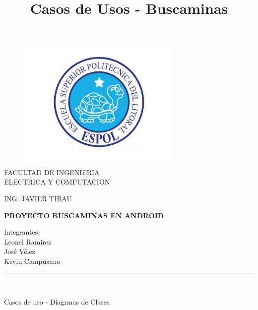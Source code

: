 \documentclass[11pt]{article} %
\title{Casos de Usos - Buscaminas }
\begin{document}
\begin{titlepage}

\begin{center}
\vspace*{-1in}
\begin{figure}[htb]
\begin{center}
\includegraphics[width=8cm]{./espol}
\end{center}
\end{figure}

FACULTAD DE INGENIERIA \\
\vspace*{0.15in}
ELECTRICA Y COMPUTACION \\
\vspace*{0.6in}
\begin{large}
ING: JAVIER TIBAU\\
\end{large}
\vspace*{0.4in}
\begin{Large}
\textbf{PROYECTO BUSCAMINAS EN ANDROID} \\
\end{Large}
\vspace*{0.5in}
\begin{large}
Integrantes:\\Leonel Ramirez\\José Vélez\\Kevin Campuzano\\ 
\end{large}
\vspace*{0.3in}
\rule{80mm}{0.1mm}\\
\vspace*{0.1in}
\begin{large}
Casos de uso - Diagrmas de Clases
\end{large}
\end{center}

\end{titlepage}
\end{document}
